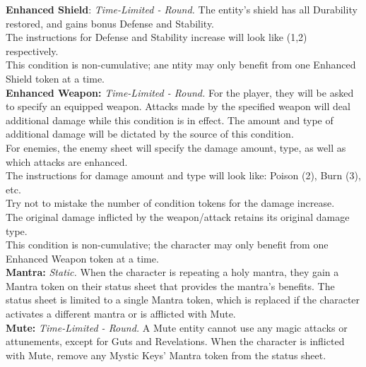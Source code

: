 \documentclass[12pt]{article}
\begin{document}
\begin{multicols*}{2}
\textbf{Enhanced Shield}: \emph{Time-Limited - Round.} The entity’s shield has all Durability restored, and gains bonus Defense and Stability.\\
The instructions for Defense and Stability increase will look like (1,2) respectively.\\
This condition is non-cumulative; ane ntity may only benefit from one Enhanced Shield token at a time.\\

\textbf{Enhanced Weapon:} \emph{Time-Limited - Round.} For the player, they will be asked to specify an equipped weapon. Attacks made by the specified weapon will deal additional damage while this condition is in effect. The amount and type of additional damage will be dictated by the source of this condition.\\
For enemies, the enemy sheet will specify the damage amount, type, as well as which attacks are enhanced.\\
The instructions for damage amount and type will look like: Poison (2), Burn (3), etc.\\
Try not to mistake the number of condition tokens for the damage increase.\\
The original damage inflicted by the weapon/attack retains its original damage type.\\
This condition is non-cumulative; the character may only benefit from one Enhanced Weapon token at a time.\\

\textbf{Mantra:} \emph{Static.} When the character is repeating a holy mantra, they gain a Mantra token on their status sheet that provides the mantra’s benefits. The status sheet is limited to a single Mantra token, which is replaced if the character activates a different mantra or is afflicted with Mute.\\

\textbf{Mute:} \emph{Time-Limited - Round.} A Mute entity cannot use any magic attacks or attunements, except for Guts and Revelations. When the character is inflicted with Mute, remove any Mystic Keys’ Mantra token from the status sheet.


\end{multicols*}
\end{document}
